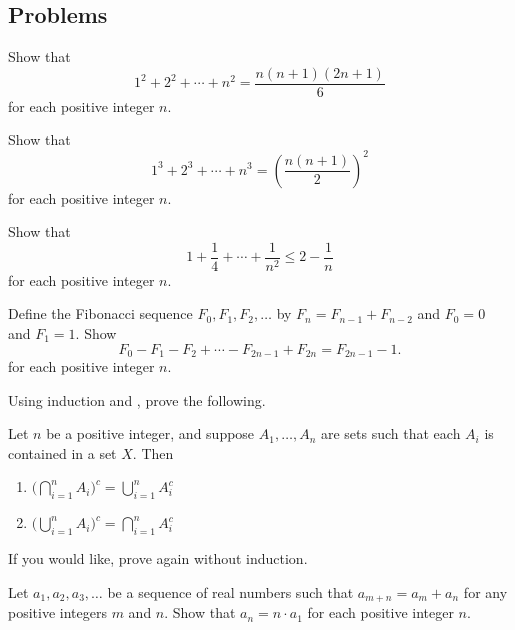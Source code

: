 \documentclass[../main.tex]{subfiles}
\begin{document}
\subsection{Problems}
\begin{homework}
    Show that
    \[1^2+2^2+\cdots +n^2=\frac{n(n+1)(2n+1)}{6}\]
    for each positive integer $n$.
\end{homework}
\begin{homework}
    Show that
    \[1^3+2^3+\cdots+n^3=\left(\frac{n(n+1)}2\right)^2\]
    for each positive integer $n$.
\end{homework}
\begin{homework} \label{hw:basel}
    Show that $$1+\frac{1}{4}+\cdots +\frac{1}{n^2} \le 2-\frac{1}{n}$$ for each positive integer $n$.
\end{homework}
\begin{homework} \label{hw:fib-diff}
    Define the Fibonacci sequence $F_0,F_1,F_2,\ldots$ by $F_n=F_{n-1}+F_{n-2}$ and $F_0=0$ and $F_1=1$. Show
    \[F_0-F_1-F_2+\cdots-F_{2n-1}+F_{2n}=F_{2n-1}-1.\]
    for each positive integer $n$.
\end{homework}
\begin{homework}
    Using induction and , prove the following.
    \begin{theorem} \label{thm:general-de-morgan}
        Let $n$ be a positive integer, and suppose $A_1, \dots, A_n$ are sets such that each $A_i$ is contained in a set $X$. Then
        \begin{enumerate}[label=(\alph*)]
            \item $\Big(\bigcap_{i = 1}^nA_i\Big)^c = \bigcup_{i = 1}^n A_i^c$
            \item $\Big(\bigcup_{i = 1}^nA_i\Big)^c = \bigcap_{i = 1}^n A_i^c$
        \end{enumerate}
    \end{theorem}
    If you would like, prove  again without induction.
\end{homework}
\begin{homework}
    Let $a_1,a_2,a_3,\ldots$ be a sequence of real numbers such that $a_{m+n}=a_m+a_n$ for any positive integers $m$ and $n$. Show that $a_n=n\cdot a_1$ for each positive integer $n$.
\end{homework}
\end{document}
